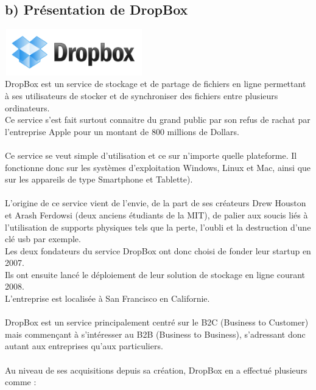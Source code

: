 \documentclass[a4paper, 10pt]{article}
\begin{document}
\subsection*{b) Pr\'esentation de DropBox}
\includegraphics[height = 2cm, width = 6cm]{jpg/dropbox_logo.png}\\
DropBox est un service de stockage et de partage de fichiers en ligne permettant \`a ses utilisateurs de stocker et
de synchroniser des fichiers entre plusieurs ordinateurs.\\
Ce service s'est fait surtout connaitre du grand public par son refus de rachat
par l'entreprise Apple pour un montant de 800 millions de Dollars.\\ \\
Ce service se veut simple d'utilisation et ce sur n'importe quelle plateforme.
Il fonctionne donc sur les syst\`emes d'exploitation Windows, Linux et Mac, ainsi que sur les appareils de type Smartphone et Tablette).\\ \\
L'origine de ce service vient de l'envie, de la part de ses cr\'eateurs Drew Houston et Arash Ferdowsi (deux anciens \'etudiants de la MIT),
de palier aux soucis li\'es \`a l'utilisation de supports physiques tels que la perte, l'oubli et la destruction d'une cl\'e usb par exemple.\\
Les deux fondateurs du service DropBox ont donc choisi de fonder leur startup en 2007.\\
Ils ont ensuite lanc\'e le d\'eploiement de leur solution de stockage en ligne courant 2008.\\
L'entreprise est localis\'ee \`a San Francisco en Californie.\\ \\
DropBox est un service principalement centr\'e sur le B2C (Business to Customer) mais commençant \`a s'int\'eresser au B2B (Business to Business),
s'adressant donc autant aux entreprises qu'aux particuliers.\\ \\
Au niveau de ses acquisitions depuis sa cr\'eation, DropBox en a effectu\'e plusieurs comme :
\end{document}
